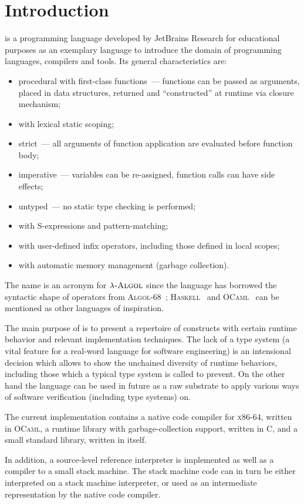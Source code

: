 \chapter{Introduction}

\lama is a programming language developed by JetBrains Research for educational purposes as an exemplary language to introduce
the domain of programming languages, compilers and tools. Its general characteristics are:

\begin{itemize}
\item procedural with first-class functions~--- functions can be passed as arguments, placed in data structures,
  returned and ``constructed'' at runtime via closure mechanism;
\item with lexical static scoping;
\item strict~--- all arguments of function application are evaluated before function body;
\item imperative~--- variables can be re-assigned, function calls can have side effects;
\item untyped~--- no static type checking is performed;
\item with S-expressions and pattern-matching;
\item with user-defined infix operators, including those defined in local scopes;
\item with automatic memory management (garbage collection).
\end{itemize}

The name \lama is an acronym for $\lambda\textsc{-Algol}$ since the language has borrowed the syntactic shape of
operators from \textsc{Algol-68}~\cite{A68}; \textsc{Haskell}~\cite{haskell} and \textsc{OCaml}~\cite{ocaml} can be
mentioned as other languages of inspiration.

The main purpose of \lama is to present a repertoire of constructs with certain runtime behavior and
relevant implementation techniques. The lack of a type system (a vital feature for a real-word language
for software engineering) is an intensional decision which allows to show the unchained diversity
of runtime behaviors, including those which a typical type system is called to prevent. On the other hand
the language can be used in future as a raw substrate to apply various ways of software verification (including
type systems) on.

The current implementation contains a native code compiler for \textsc{x86-64}, written
in \textsc{OCaml}, a runtime library with garbage-collection support, written in \textsc{C}, and a small
standard library, written in \lama itself.

In addition, a source-level reference interpreter is implemented as well as a compiler to a small
stack machine. The stack machine code can in turn be either interpreted on a stack machine interpreter, or
used as an intermediate representation by the native code compiler.
